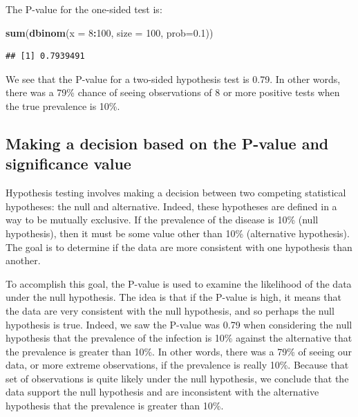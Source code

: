 \documentclass[
]{book}
\newenvironment{Shaded}{\begin{snugshade}}{\end{snugshade}}
\newcommand{\AttributeTok}[1]{\textcolor[rgb]{0.13,0.29,0.53}{#1}}
\newcommand{\DecValTok}[1]{\textcolor[rgb]{0.00,0.00,0.81}{#1}}
\newcommand{\FloatTok}[1]{\textcolor[rgb]{0.00,0.00,0.81}{#1}}
\newcommand{\FunctionTok}[1]{\textcolor[rgb]{0.13,0.29,0.53}{\textbf{#1}}}
\newcommand{\NormalTok}[1]{#1}
\newcommand{\SpecialCharTok}[1]{\textcolor[rgb]{0.81,0.36,0.00}{\textbf{#1}}}
\begin{document}
The P-value for the one-sided test is:

\begin{Shaded}
\begin{Highlighting}[]
\FunctionTok{sum}\NormalTok{(}\FunctionTok{dbinom}\NormalTok{(}\AttributeTok{x =} \DecValTok{8}\SpecialCharTok{:}\DecValTok{100}\NormalTok{, }\AttributeTok{size =} \DecValTok{100}\NormalTok{, }\AttributeTok{prob=}\FloatTok{0.1}\NormalTok{))}
\end{Highlighting}
\end{Shaded}

\begin{verbatim}
## [1] 0.7939491
\end{verbatim}

We see that the P-value for a two-sided hypothesis test is 0.79. In other words, there was a 79\% chance of seeing observations of 8 or more positive tests when the true prevalence is 10\%.

\subsection{Making a decision based on the P-value and significance value}\label{making-a-decision-based-on-the-p-value-and-significance-value}

Hypothesis testing involves making a decision between two competing statistical hypotheses: the null and alternative. Indeed, these hypotheses are defined in a way to be mutually exclusive. If the prevalence of the disease is 10\% (null hypothesis), then it must be some value other than 10\% (alternative hypothesis). The goal is to determine if the data are more consistent with one hypothesis than another.

To accomplish this goal, the P-value is used to examine the likelihood of the data under the null hypothesis. The idea is that if the P-value is high, it means that the data are very consistent with the null hypothesis, and so perhaps the null hypothesis is true. Indeed, we saw the P-value was 0.79 when considering the null hypothesis that the prevalence of the infection is 10\% against the alternative that the prevalence is greater than 10\%. In other words, there was a 79\% of seeing our data, or more extreme observations, if the prevalence is really 10\%. Because that set of observations is quite likely under the null hypothesis, we conclude that the data support the null hypothesis and are inconsistent with the alternative hypothesis that the prevalence is greater than 10\%.
\end{document}
